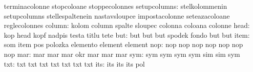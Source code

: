                                   terminacolonne                   stopcoloane
                                  stoppecolonnes
                    setupcolumns: stelkolommenin                   setupcolumns
                                  stellespaltenein                 nastavsloupce
                                  impostacolonne                   seteazacoloane
                                  reglecolonnes
                          column: kolom                            column
                                  spalte                           sloupec
                                  colonna                          coloana
                                  colonne
                            head: kop                              head
                                  kopf                             nadpis
                                  testa                            titlu
                                  tete
                             but: but                              but
                                  but                              spodek
                                  fondo                            but
                                  but
                            item: som                              item
                                  pos                              polozka
                                  elemento                         element
                                  element
                             nop: nop                              nop
                                  nop                              nop
                                  nop                              nop
                                  nop
                             mar: mar                              mar
                                  mar                              okr
                                  mar                              mar
                                  mar
                             sym: sym                              sym
                                  sym                              sym
                                  sim                              sim
                                  sym
                             txt: txt                              txt
                                  txt                              txt
                                  txt                              txt
                                  txt
                             its: its                              its
                                  its                              pol %
